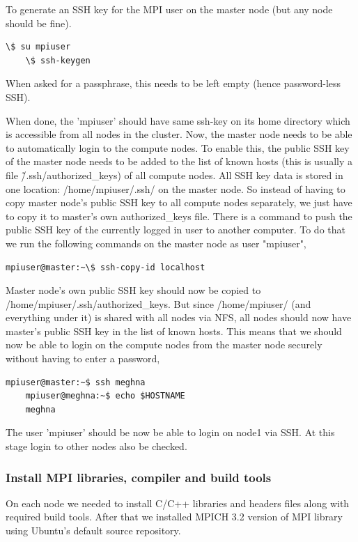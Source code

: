 To generate an SSH key for the MPI user on the master node (but any node should be fine).
\begin{lstlisting}[style=BashInputStyle]
	\$ su mpiuser
	\$ ssh-keygen
\end{lstlisting}

When asked for a passphrase, this needs to be left empty (hence password-less SSH).

When done, the 'mpiuser' should have same ssh-key on its home directory which is accessible from all nodes in the cluster. Now, the master node needs to be able to automatically login to the compute nodes. To enable this, the public SSH key of the master node needs to be added to the list of known hosts (this is usually a file \~/.ssh/authorized\_keys) of all compute nodes. All SSH key data is stored in one location: /home/mpiuser/.ssh/ on the master node. So instead of having to copy master node's public SSH key to all compute nodes separately, we just have to copy it to master's own authorized\_keys file. There is a command to push the public SSH key of the currently logged in user to another computer. To do that we run the following commands on the master node as user "mpiuser",
\begin{lstlisting}[style=BashInputStyle]
	mpiuser@master:~\$ ssh-copy-id localhost
\end{lstlisting}

Master node's own public SSH key should now be copied to /home/mpiuser/.ssh/authorized\_keys. But since /home/mpiuser/ (and everything under it) is shared with all nodes via NFS, all nodes should now have master's public SSH key in the list of known hosts. This means that we should now be able to login on the compute nodes from the master node securely without having to enter a password,

\begin{lstlisting}[style=BashInputStyle]
	mpiuser@master:~$ ssh meghna
	mpiuser@meghna:~$ echo $HOSTNAME
	meghna
\end{lstlisting}

The user 'mpiuser' should be now be able to login on node1 via SSH. At this stage login to other nodes also be checked.

\subsubsection{Install MPI libraries, compiler and build tools}
On each node we needed to install C/C++ libraries and headers files along with required build tools. After that we installed MPICH 3.2 version of MPI library using Ubuntu's default source repository.

